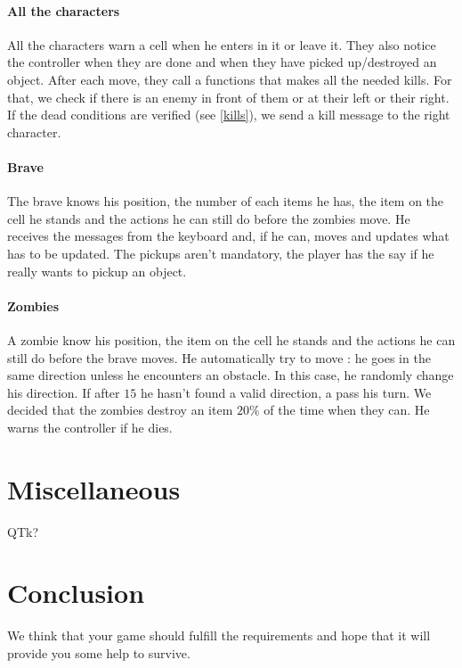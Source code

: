 \documentclass[11pt,a4paper]{article}
\begin{document}
\paragraph{All the characters}
All the characters warn a cell when he enters in it or leave it. They also notice the controller when they are done and when they have picked up/destroyed an object. After each move, they call a functions that makes all the needed kills. For that, we check if there is an enemy in front of them or at their left or their right. If the dead conditions are verified (see \ref{kills}), we send a kill message to the right character. 

\paragraph{Brave}
The brave knows his position, the number of each items he has, the item on the cell he stands and the actions he can still do before the zombies move. He receives the messages from the keyboard and, if he can, moves and updates what has to be updated. The pickups aren't mandatory, the player has the say if he really wants to pickup an object.

\paragraph{Zombies}
A zombie know his position, the item on the cell he stands and the actions he can still do before the brave moves. He automatically try to move : he goes in the same direction unless he encounters an obstacle. In this case, he randomly change his direction. If after $15$ he hasn't found a valid direction, a pass his turn. We decided that the zombies destroy an item $20\%$ of the time when they can. He warns the controller if he dies. 

\section{Miscellaneous}
QTk?
    
\section*{Conclusion}
We think that your game should fulfill the requirements and hope that it will provide you some help to survive.
    
\end{document}
